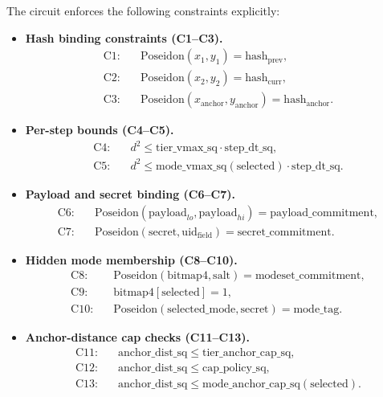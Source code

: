 \documentclass[conference]{IEEEtran}
\theoremstyle{definition}
\theoremstyle{plain}
\begin{document}
The circuit enforces the following constraints explicitly:
\begin{itemize}
\item \textbf{Hash binding constraints (C1--C3).}
\[
\begin{aligned}
\text{C1:}\quad & \mathrm{Poseidon}(x_1,y_1)=\mathrm{hash}_{\mathrm{prev}},\\
\text{C2:}\quad & \mathrm{Poseidon}(x_2,y_2)=\mathrm{hash}_{\mathrm{curr}},\\
\text{C3:}\quad & \mathrm{Poseidon}(x_{\mathrm{anchor}},y_{\mathrm{anchor}})
=\mathrm{hash}_{\mathrm{anchor}}.
\end{aligned}
\]

\item \textbf{Per-step bounds (C4--C5).}
\[
\begin{aligned}
\text{C4:}\quad & d^2 \le \mathrm{tier\_vmax\_sq}\cdot \mathrm{step\_dt\_sq},\\
\text{C5:}\quad & d^2 \le \mathrm{mode\_vmax\_sq}(\mathrm{selected})\cdot \mathrm{step\_dt\_sq}.
\end{aligned}
\]

\item \textbf{Payload and secret binding (C6--C7).}
\[
\begin{aligned}
\text{C6:}\quad & \mathrm{Poseidon}(\mathrm{payload}_{lo},\mathrm{payload}_{hi})
= \mathrm{payload\_commitment},\\
\text{C7:}\quad & \mathrm{Poseidon}(\mathrm{secret},\mathrm{uid}_{\mathrm{field}})
= \mathrm{secret\_commitment}.
\end{aligned}
\]

\item \textbf{Hidden mode membership (C8--C10).}
\[
\begin{aligned}
\text{C8:}\quad & \mathrm{Poseidon}(\mathrm{bitmap4},\mathrm{salt})
= \mathrm{modeset\_commitment},\\
\text{C9:}\quad & \mathrm{bitmap4}[\mathrm{selected}] = 1,\\
\text{C10:}\quad & \mathrm{Poseidon}(\mathrm{selected\_mode},\mathrm{secret})
= \mathrm{mode\_tag}.
\end{aligned}
\]

\item \textbf{Anchor-distance cap checks (C11--C13).}
\[
\begin{aligned}
\text{C11:}\quad & \mathrm{anchor\_dist\_sq}
\le \mathrm{tier\_anchor\_cap\_sq},\\
\text{C12:}\quad & \mathrm{anchor\_dist\_sq}
\le \mathrm{cap\_policy\_sq},\\
\text{C13:}\quad & \mathrm{anchor\_dist\_sq}
\le \mathrm{mode\_anchor\_cap\_sq}(\mathrm{selected}).
\end{aligned}
\]


\end{itemize}
\end{document}
